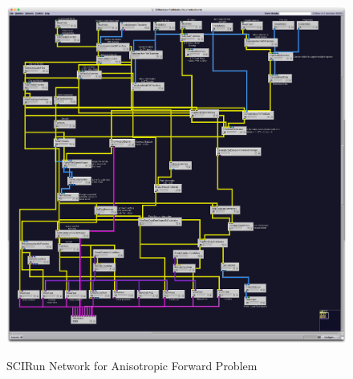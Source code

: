 \begin{figure}[p]
\begin{center}
\includegraphics[width=\textwidth]{Figures/aniso_network.png}\\
\caption{SCIRun Network for Anisotropic Forward Problem}
\label{fig:anisofor}
\end{center}
\end{figure}

